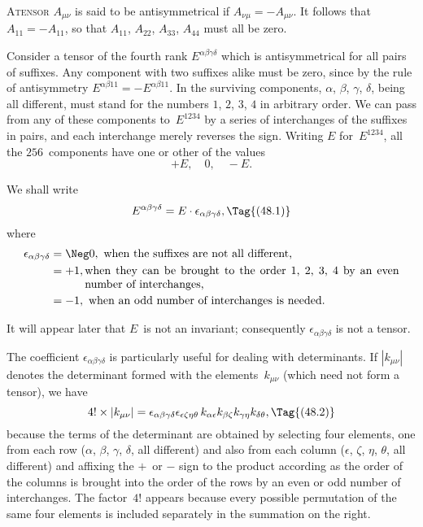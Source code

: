 \documentclass[12pt]{book}
\begin{document}
%

\lettrine{A}{tensor} $A_{\mu\nu}$ is said to be antisymmetrical if $A_{\nu\mu} = -A_{\mu\nu}$.
It follows that $A_{11} = -A_{11}$, so that $A_{11}$, $A_{22}$, $A_{33}$, $A_{44}$ must all be zero.

Consider a tensor of the fourth rank $E^{\alpha\beta\gamma\delta}$ which is antisymmetrical for
all pairs of suffixes. Any component with two suffixes alike must be zero,
since by the rule of antisymmetry $E^{\alpha\beta11} = -E^{\alpha\beta11}$. In the surviving components,
$\alpha$, $\beta$, $\gamma$, $\delta$, being all different, must stand for the numbers $1$, $2$, $3$, $4$
in arbitrary order. We can pass from any of these components to~$E^{1234}$ by a
series of interchanges of the suffixes in pairs, and each interchange merely
reverses the sign. Writing $E$ for~$E^{1234}$, all the $256$~components have one or
other of the values
\[
+E,\quad 0,\quad -E.
\]

We shall write
\[
E^{\alpha\beta\gamma\delta} = E \cdot \epsilon_{\alpha\beta\gamma\delta},
\Tag{(48.1)}
\]
where
\begin{align*}
  \epsilon_{\alpha\beta\gamma\delta}
  &= \Neg0, \text{ when the suffixes are not all different,} \\
  &= +1, \parbox[t]{0.8\textwidth}{ when they can be brought to the order $1$, $2$, $3$, $4$ by an even
    number of interchanges,} \\
  &= -1, \text{ when an odd number of interchanges is needed.}
\end{align*}

It will appear later that $E$~is not an invariant; consequently $\epsilon_{\alpha\beta\gamma\delta}$ is not
a tensor.

The coefficient $\epsilon_{\alpha\beta\gamma\delta}$ is particularly useful for dealing with determinants.
If $|k_{\mu\nu}|$ denotes the determinant formed with the elements~$k_{\mu\nu}$ (which need
%
not form a tensor), we have
\[
4! \times |k_{\mu\nu}| = \epsilon_{\alpha\beta\gamma\delta} \epsilon_{\epsilon\zeta\eta\theta}\, k_{\alpha\epsilon} k_{\beta\zeta} k_{\gamma\eta} k_{\delta\theta},
\Tag{(48.2)}
\]
because the terms of the determinant are obtained by selecting four elements,
one from each row ($\alpha$, $\beta$, $\gamma$, $\delta$, all different) and also from each column ($\epsilon$, $\zeta$, $\eta$, $\theta$,
all different) and affixing the $+$~or $-$ sign to the product according as the
order of the columns is brought into the order of the rows by an even or odd
number of interchanges. The factor~$4!$ appears because every possible permutation
of the same four elements is included separately in the summation
on the right.
\end{document}
